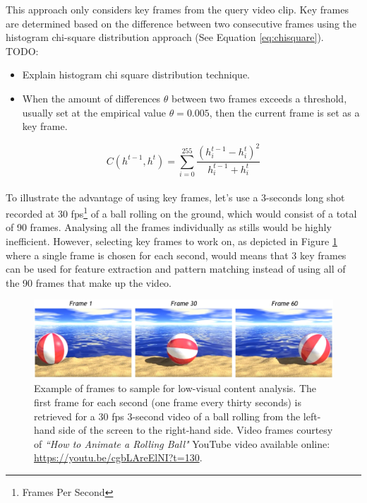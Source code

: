 \documentclass[11pt,openany,a4paper]{article}
\begin{document}
\cite{heo2016colortransfer}
This approach only considers key frames from the query video clip. Key frames are determined based on the difference between two consecutive frames using the histogram chi-square distribution approach (See Equation \ref{eq:chisquare}).\\

TODO:
\begin{itemize}
    \item Explain histogram chi square distribution technique.
    \item When the amount of differences $\theta$ between two frames exceeds a threshold, usually set at the empirical value $\theta = 0.005$, then the current frame is set as a key frame.
\end{itemize}

\begingroup \Large \begin{equation} \label{eq:chisquare}
    C(h^{t-1}, h^{t}) = \sum_{i=0}^{255} \frac{(h_{i}^{t-1} - h_{i}^{t})^2}{h_{i}^{t-1} + h_{i}^{t}}
\end{equation} \endgroup \\

To illustrate the advantage of using key frames, let's use a 3-seconds long shot recorded at 30 fps\footnote{Frames Per Second} of a ball rolling on the ground, which would consist of a total of 90 frames. Analysing all the frames individually as stills would be highly inefficient. However, selecting key frames to work on, as depicted in Figure \ref{fig:rolling_ball} where a single frame is chosen for each second, would means that 3 key frames can be used for feature extraction and pattern matching instead of using all of the 90 frames that make up the video.\\

\begin{figure}[h]
\centerline{\includegraphics[width=\textwidth]{figures/ball_rolling.jpg}}
\caption{\label{fig:rolling_ball}Example of frames to sample for low-visual content analysis. The first frame for each second (one frame every thirty seconds) is retrieved for a 30 fps 3-second video of a ball rolling from the left-hand side of the screen to the right-hand side. Video frames courtesy of \textit{``How to Animate a Rolling Ball"} YouTube video available online: \url{https://youtu.be/cgbLAreElNI?t=130}.}
\end{figure}
\end{document}
